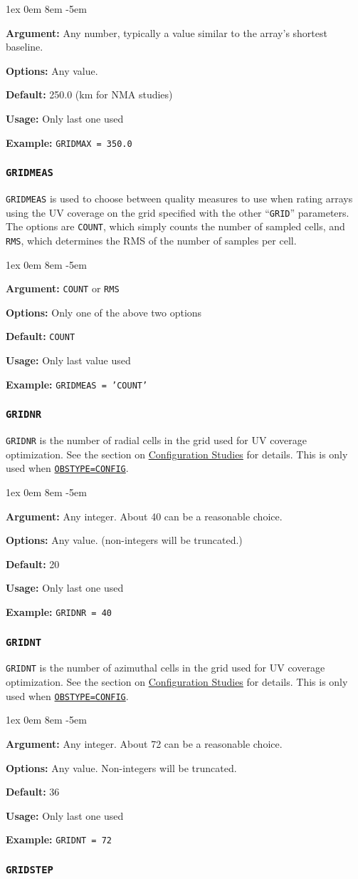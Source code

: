 \documentclass{report}
\newcommand{\rcwbox}[5]{
  \begin{list}{}{\parsep 1ex  \itemsep 0em
                 \leftmargin 8em  \itemindent -5em }
    \item {\bf Argument:} #1
    \item {\bf Options:}  #2
    \item {\bf Default:}  #3
    \item {\bf Usage:}    #4
    \item {\bf Example:}  #5
  \end{list}
}
\begin{document}
\rcwbox
{Any number, typically a value similar to the array's shortest baseline.}
{Any value.}
{250.0 (km for NMA studies)}
{Only last one used}
{{\tt GRIDMAX = 350.0}}

\subsubsection{\label{MP:GRIDMEAS}{\tt GRIDMEAS}}

{\tt GRIDMEAS} is used to choose between quality measures to use
when rating arrays using the UV coverage on the grid specified
with the other ``{\tt GRID}'' parameters.  The options are
{\tt COUNT}, which simply counts the number of sampled cells,
and {\tt RMS}, which determines the RMS of the number of samples
per cell.

\rcwbox
{{\tt COUNT} or {\tt RMS}}
{Only one of the above two options}
{{\tt COUNT}}
{Only last value used}
{{\tt GRIDMEAS = 'COUNT'}}


\subsubsection{\label{MP:GRIDNR}{\tt GRIDNR}}

{\tt GRIDNR} is the number of radial cells in the grid used for UV
coverage optimization.  See the section on 
{\hyperref[SEC:CONFIG]{Configuration Studies}}
for details. This is only used when
{\hyperref[MP:OBSTYPE]{{\tt OBSTYPE=CONFIG}}}.

\rcwbox
{Any integer.  About 40 can be a reasonable choice.}
{Any value. (non-integers will be truncated.)}
{20}
{Only last one used}
{{\tt GRIDNR = 40}}

\subsubsection{\label{MP:GRIDNT}{\tt GRIDNT}}

{\tt GRIDNT} is the number of azimuthal cells in the grid used for UV
coverage optimization.  See the section on 
{\hyperref[SEC:CONFIG]{Configuration Studies}}
for details.  This is only used when
{\hyperref[MP:OBSTYPE]{{\tt OBSTYPE=CONFIG}}}.

\rcwbox
{Any integer.  About 72 can be a reasonable choice.}
{Any value. Non-integers will be truncated.}
{36}
{Only last one used}
{{\tt GRIDNT = 72}}

\subsubsection{\label{MP:GRIDSTEP}{\tt GRIDSTEP}}
\end{document}
